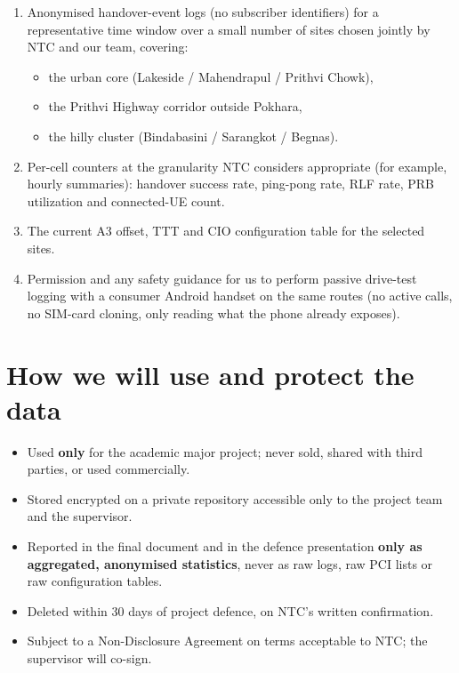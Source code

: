 \documentclass[11pt,a4paper]{article}
\begin{document}
\begin{enumerate}[leftmargin=*]
    \item Anonymised handover-event logs (no subscriber identifiers)
    for a representative time window over a small number of sites
    chosen jointly by NTC and our team, covering:
    \begin{itemize}[leftmargin=*]
        \item the urban core (Lakeside / Mahendrapul / Prithvi Chowk),
        \item the Prithvi Highway corridor outside Pokhara,
        \item the hilly cluster (Bindabasini / Sarangkot / Begnas).
    \end{itemize}
    \item Per-cell counters at the granularity NTC considers
    appropriate (for example, hourly summaries): handover success
    rate, ping-pong rate, RLF rate, PRB utilization and connected-UE
    count.
    \item The current A3 offset, TTT and CIO configuration table for
    the selected sites.
    \item Permission and any safety guidance for us to perform passive
    drive-test logging with a consumer Android handset on the same
    routes (no active calls, no SIM-card cloning, only reading what the
    phone already exposes).
\end{enumerate}

\section{How we will use and protect the data}

\begin{itemize}[leftmargin=*]
    \item Used \textbf{only} for the academic major project; never sold,
    shared with third parties, or used commercially.
    \item Stored encrypted on a private repository accessible only to
    the project team and the supervisor.
    \item Reported in the final document and in the defence presentation
    \textbf{only as aggregated, anonymised statistics}, never as raw
    logs, raw PCI lists or raw configuration tables.
    \item Deleted within $30$ days of project defence, on NTC's written
    confirmation.
    \item Subject to a Non-Disclosure Agreement on terms acceptable to
    NTC; the supervisor will co-sign.
\end{itemize}
\end{document}
